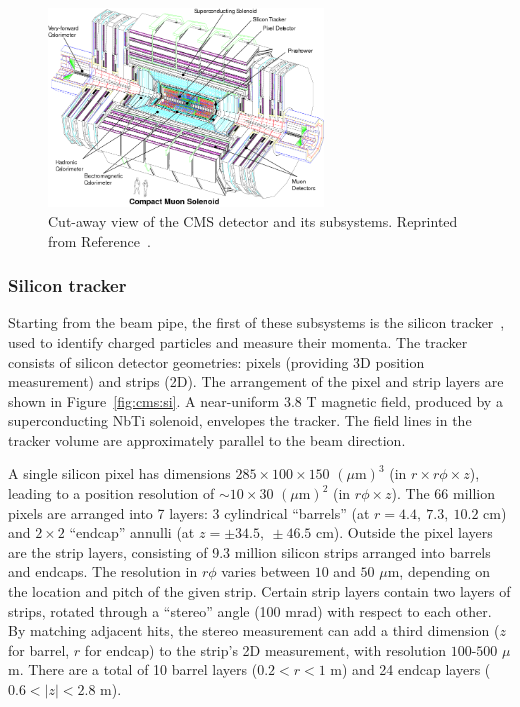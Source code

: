\begin{figure}[][]
    \begin{center}
        \includegraphics[width=0.65\textwidth]{figures/cms/cms.png}
        \caption{Cut-away view of the CMS detector and its subsystems.
                 Reprinted from Reference~\cite{cmsjinst}.}
        \label{fig:cms:cms}
    \end{center}
\end{figure}

\subsubsection{Silicon tracker}

Starting from the beam pipe, the first of these subsystems is the silicon tracker~\cite{cmstracker}, used to identify charged particles and measure their momenta. 
The tracker consists of silicon detector geometries: pixels (providing 3D position measurement) and strips (2D). 
The arrangement of the pixel and strip layers are shown in Figure~\ref{fig:cms:si}.
A near-uniform 3.8 T magnetic field, produced by a superconducting NbTi solenoid, envelopes the tracker. 
The field lines in the tracker volume are approximately parallel to the beam direction. 

A single silicon pixel has dimensions $285\times100\times150$ $(\mu\mathrm{m})^3$ (in $r\times r\phi\times z$), leading to a position resolution of $\sim10\times30$ $(\mu\mathrm{m})^2$ (in $r\phi\times z$). 
The 66 million pixels are arranged into 7 layers: 3 cylindrical ``barrels'' (at $r=4.4,~7.3,~10.2$ cm) and $2\times2$ ``endcap'' annulli (at $z=\pm34.5,~\pm46.5$ cm). 
Outside the pixel layers are the strip layers, consisting of 9.3 million silicon strips arranged into barrels and endcaps.
The resolution in $r\phi$ varies between $10$ and $50$ $\mu$m, depending on the location and pitch of the given strip.
Certain strip layers contain two layers of strips, rotated through a ``stereo'' angle (100 mrad) with respect to each other.
By matching adjacent hits, the stereo measurement can add a third dimension ($z$ for barrel, $r$ for endcap) to the strip's 2D measurement, with resolution $100$-$500$ $\mu$m.
There are a total of 10 barrel layers ($0.2 < r < 1$ m) and 24 endcap layers ($0.6 < |z| < 2.8$ m). 

